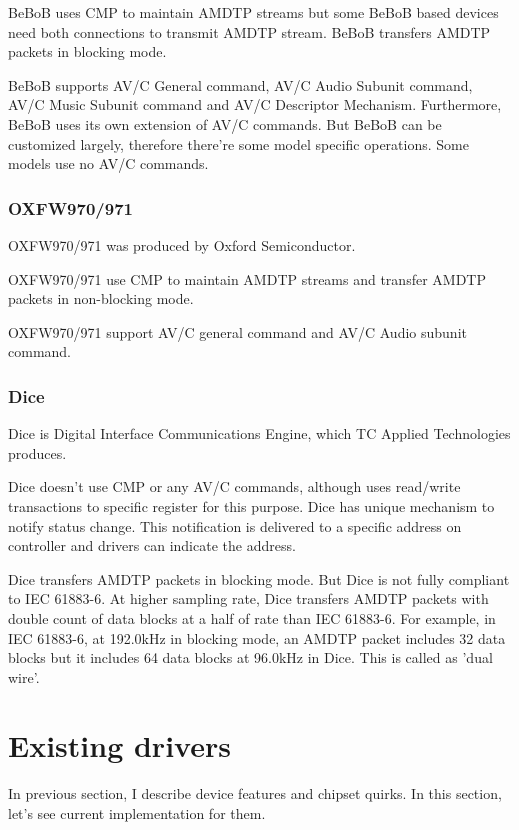 \documentclass[onecolumn]{article}
\begin{document}
BeBoB uses CMP to maintain AMDTP streams but some BeBoB based devices need both connections to transmit AMDTP stream. BeBoB transfers AMDTP packets in blocking mode.

BeBoB supports AV/C General command\cite{avc-general-4-2}, AV/C Audio Subunit command\cite{avc-audio-1}, AV/C Music Subunit command\cite{avc-music-1} and AV/C Descriptor Mechanism\cite{avc-general-enhancement}. Furthermore, BeBoB uses its own extension of AV/C commands\cite{bebob-1, bebob-2}. But BeBoB can be customized largely, therefore there're some model specific operations. Some models use no AV/C commands.


\subsubsection{OXFW970/971}
OXFW970/971 was produced by Oxford Semiconductor.

OXFW970/971 use CMP to maintain AMDTP streams and transfer AMDTP packets in non-blocking mode.

OXFW970/971 support AV/C general command\cite{avc-general-4-2} and AV/C Audio subunit command\cite{avc-audio-1}.

\subsubsection{Dice}
Dice is Digital Interface Communications Engine, which TC Applied Technologies produces.

Dice doesn't use CMP or any AV/C commands, although uses read/write transactions to specific register for this purpose. Dice has unique mechanism to notify status change. This notification is delivered to a specific address on controller and drivers can indicate the address.

Dice transfers AMDTP packets in blocking mode. But Dice is not fully compliant to IEC 61883-6. At higher sampling rate, Dice transfers AMDTP packets with double count of data blocks at a half of rate than IEC 61883-6. For example, in IEC 61883-6, at 192.0kHz in blocking mode, an AMDTP packet includes 32 data blocks but it includes 64 data blocks at 96.0kHz in Dice. This is called as 'dual wire'.


\section{Existing drivers}

In previous section, I describe device features and chipset quirks. In this section, let's see current implementation for them.
\end{document}
